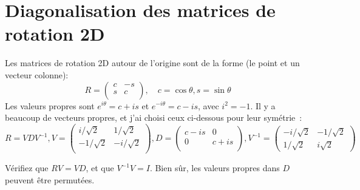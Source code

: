 \documentclass[a4paper]{article}
\begin{document}
\section{Diagonalisation des matrices de rotation 2D}
Les matrices de rotation 2D autour de l'origine sont de la forme (le point et un vecteur colonne):
$$R=\left( \begin{array} {ll}
c & -s \\
s & c \\
\end{array}\right), \quad c=\cos \theta, s=\sin \theta$$
Les valeurs propres sont $e^{i\theta}= c + i s$ et  $e^{-i\theta}=c - i s$, avec $i^2= -1$.
Il y a beaucoup de vecteurs propres, et j'ai choisi ceux ci-dessous pour leur sym\'etrie~:
$$R=VDV^{-1}, V=\left( \begin{array}{ll}
i/\sqrt{2} & 1/\sqrt{2} \\
-1/\sqrt{2} & -i/\sqrt{2} \\
\end{array}\right),
D=\left( \begin{array}{ll}
c-is & 0 \\
0 & c+is \\
\end{array}\right),
V^{-1}=\left( \begin{array}{ll}
-i/\sqrt{2} & -1/\sqrt{2} \\
1/\sqrt{2} & i\sqrt{2}
\end{array}\right)$$

V\'erifiez 
que 
$RV=VD$, 
et que 
$V^{-1}V=I$. Bien s\^ur, les valeurs propres dans $D$ peuvent être permut\'ees.
\end{document}
